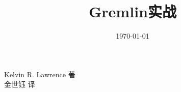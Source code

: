 \documentclass[UTF8]{ctexart}
\title{Gremlin实战}
\date{\today}
\begin{document}
\maketitle

\begin{flushright}
Kelvin R. Lawrence {}著\\
金世钰{ }译
\end{flushright}
\end{document}

